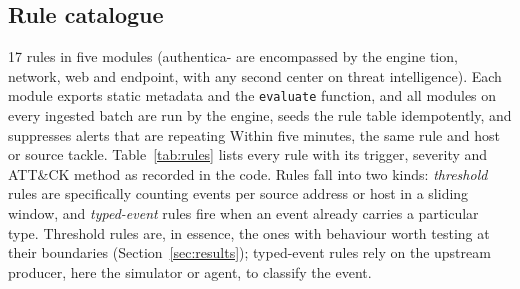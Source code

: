 \documentclass[conference]{IEEEtran}
\newcommand{\code}[1]{\texttt{#1}}
\begin{document}
\subsection{Rule catalogue}
17 rules in five modules (authentica- are encompassed by the engine tion, network, web and endpoint, with any second center on threat intelligence). Each module exports static metadata and the \code{evaluate} function, and all modules on every ingested batch are run by the engine, seeds the rule table idempotently, and suppresses alerts that are repeating Within five minutes, the same rule and host or source tackle. Table~\ref{tab:rules} lists every rule with its trigger, severity and ATT\&CK method as recorded in the code. Rules fall into two kinds: \emph{threshold} rules are specifically counting events per source address or host in a sliding window, and \emph{typed-event} rules fire when an event already carries a particular type. Threshold rules are, in essence, the ones with behaviour worth testing at their boundaries (Section~\ref{sec:results}); typed-event rules rely on the upstream producer, here the simulator or agent, to classify the event.
\end{document}
